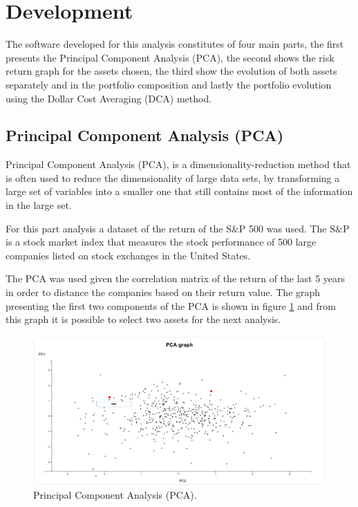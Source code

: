 \documentclass{article}
\begin{document}
\section{Development}

The software developed for this analysis constitutes of four main parts, the first presents the Principal Component Analysis (PCA), the second shows the risk return graph for the assets chosen, the third show the evolution of both assets separately and in the portfolio composition and lastly the portfolio evolution using the Dollar Cost Averaging (DCA) method.

\subsection{Principal Component Analysis (PCA)}

Principal Component Analysis (PCA), is a dimensionality-reduction method that is often used to reduce the dimensionality of large data sets, by transforming a large set of variables into a smaller one that still contains most of the information in the large set.

For this part analysis a dataset of the return of the S&P 500 \cite{sep} was used. The S&P is a stock market index that measures the stock performance of 500 large companies listed on stock exchanges in the United States.

The PCA was used given the correlation matrix of the return of the last 5 years in order to distance the companies based on their return value. The graph presenting the first two components of the PCA is shown in figure \ref{fig:pca} and from this graph it is possible to select two assets for the next analysis.

\begin{figure}
  \includegraphics[scale=0.25]{images/pca.png}
  \centering
  \caption{Principal Component Analysis (PCA).}
  \label{fig:pca}
\end{figure}
\end{document}
